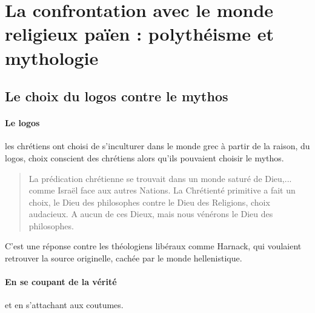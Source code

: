 \section{{La confrontation avec le monde religieux païen : polythéisme
  et mythologie}}
  
 \subsection{Le choix du logos contre le mythos}
   
\paragraph{Le logos} les chrétiens ont choisi de s'inculturer dans le monde grec à partir de la raison, du logos, choix conscient des chrétiens alors qu'ils pouvaient choisir le mythos.  
\begin{quote}
    La prédication chrétienne se trouvait dans un monde saturé de Dieu,... comme Israël face aux autres Nations. La Chrétienté primitive a fait un choix, le Dieu des philosophes contre le Dieu des Religions, choix audacieux. 
A aucun de ces Dieux, mais nous vénérons le Dieu des philosophes.
\end{quote}
C'est une réponse contre les théologiens libéraux comme Harnack, qui voulaient retrouver la source originelle, cachée par le monde hellenistique.

\paragraph{En se coupant de la vérité} et en s'attachant aux coutumes.

